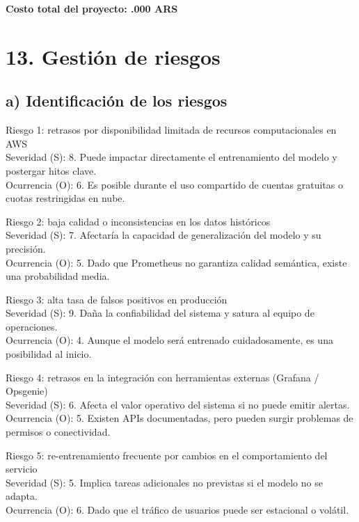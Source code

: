 \documentclass[
11pt, %
]{charter}
\begin{document}
\vspace{0.5cm}

\noindent\textbf{Costo total del proyecto: .000 ARS}


\newpage



\section{13. Gestión de riesgos}
\label{sec:riesgos}

\subsection*{a) Identificación de los riesgos}

Riesgo 1: retrasos por disponibilidad limitada de recursos computacionales en AWS \\
Severidad (S): 8. Puede impactar directamente el entrenamiento del modelo y postergar hitos clave. \\
Ocurrencia (O): 6. Es posible durante el uso compartido de cuentas gratuitas o cuotas restringidas en nube.

\vspace{0.2cm}
Riesgo 2: baja calidad o inconsistencias en los datos históricos \\
Severidad (S): 7. Afectaría la capacidad de generalización del modelo y su precisión. \\
Ocurrencia (O): 5. Dado que Prometheus no garantiza calidad semántica, existe una probabilidad media.

\vspace{0.2cm}
Riesgo 3: alta tasa de falsos positivos en producción \\
Severidad (S): 9. Daña la confiabilidad del sistema y satura al equipo de operaciones. \\
Ocurrencia (O): 4. Aunque el modelo será entrenado cuidadosamente, es una posibilidad al inicio.

\vspace{0.2cm}
Riesgo 4: retrasos en la integración con herramientas externas (Grafana / Opsgenie) \\
Severidad (S): 6. Afecta el valor operativo del sistema si no puede emitir alertas. \\
Ocurrencia (O): 5. Existen APIs documentadas, pero pueden surgir problemas de permisos o conectividad.

\vspace{0.2cm}
Riesgo 5: re-entrenamiento frecuente por cambios en el comportamiento del servicio \\
Severidad (S): 5. Implica tareas adicionales no previstas si el modelo no se adapta. \\
Ocurrencia (O): 6. Dado que el tráfico de usuarios puede ser estacional o volátil.
\end{document}
